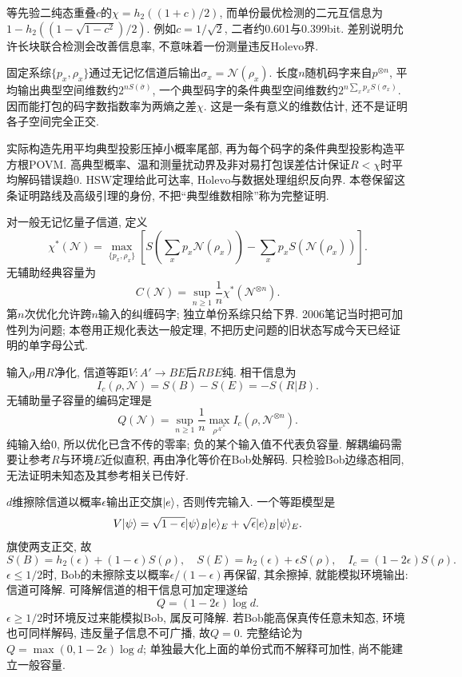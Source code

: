 等先验二纯态重叠$c$的$\chi=h_2((1+c)/2)$, 而单份最优检测的二元互信息为$1-h_2((1-\sqrt{1-c^2})/2)$. 例如$c=1/\sqrt2$, 二者约0.601与0.399bit. 差别说明允许长块联合检测会改善信息率, 不意味着一份测量违反Holevo界.

固定系综$\{p_x,\rho_x\}$通过无记忆信道后输出$\sigma_x=\mathcal N(\rho_x)$. 长度$n$随机码字来自$p^{\otimes n}$, 平均输出典型空间维数约$2^{nS(\bar\sigma)}$, 一个典型码字的条件典型空间维数约$2^{n\sum_xp_xS(\sigma_x)}$. 因而能打包的码字数指数率为两熵之差$\chi$. 这是一条有意义的维数估计, 还不是证明各子空间完全正交.

实际构造先用平均典型投影压掉小概率尾部, 再为每个码字的条件典型投影构造平方根POVM. 高典型概率、温和测量扰动界及非对易打包误差估计保证$R<\chi$时平均解码错误趋0. HSW定理给此可达率, Holevo与数据处理组织反向界. 本卷保留这条证明路线及高级引理的身份, 不把“典型维数相除”称为完整证明.

对一般无记忆量子信道, 定义
\[\chi^*(\mathcal N)=\max_{\{p_x,\rho_x\}}
 \left[S\!\left(\sum_xp_x\mathcal N(\rho_x)\right)
       -\sum_xp_xS(\mathcal N(\rho_x))\right].\]
无辅助经典容量为
\[C(\mathcal N)=\sup_{n\ge1}\frac1n\chi^*(\mathcal N^{\otimes n}).\]
第$n$次优化允许跨$n$输入的纠缠码字; 独立单份系综只给下界. 2006笔记当时把可加性列为问题; 本卷用正规化表达一般定理, 不把历史问题的旧状态写成今天已经证明的单字母公式.

输入$\rho$用$R$净化, 信道等距$V:A'\to BE$后$RBE$纯. 相干信息为
\[I_c(\rho,\mathcal N)=S(B)-S(E)=-S(R|B).\]
无辅助量子容量的编码定理是
\[Q(\mathcal N)=\sup_{n\ge1}\frac1n
 \max_{\rho^{A'^n}}I_c(\rho,\mathcal N^{\otimes n}).\]
纯输入给0, 所以优化已含不传的零率; 负的某个输入值不代表负容量. 解耦编码需要让参考$R$与环境$E$近似直积, 再由净化等价在Bob处解码. 只检验Bob边缘态相同, 无法证明未知态及其参考相关已传好.

$d$维擦除信道以概率$\epsilon$输出正交旗$\lvert e\rangle$, 否则传完输入. 一个等距模型是
\[V\lvert \psi\rangle=\sqrt{1-\epsilon}\lvert \psi\rangle_B\lvert e\rangle_E
          +\sqrt\epsilon\lvert e\rangle_B\lvert \psi\rangle_E.\]
旗使两支正交, 故
\[S(B)=h_2(\epsilon)+(1-\epsilon)S(\rho),\quad
 S(E)=h_2(\epsilon)+\epsilon S(\rho),\quad
 I_c=(1-2\epsilon)S(\rho).\]
$\epsilon\le1/2$时, Bob的未擦除支以概率$\epsilon/(1-\epsilon)$再保留, 其余擦掉, 就能模拟环境输出: 信道可降解. 可降解信道的相干信息可加定理遂给
\[Q=(1-2\epsilon)\log d.\]
$\epsilon\ge1/2$时环境反过来能模拟Bob, 属反可降解. 若Bob能高保真传任意未知态, 环境也可同样解码, 违反量子信息不可广播, 故$Q=0$. 完整结论为$Q=\max(0,1-2\epsilon)\log d$; 单独最大化上面的单份式而不解释可加性, 尚不能建立一般容量.

